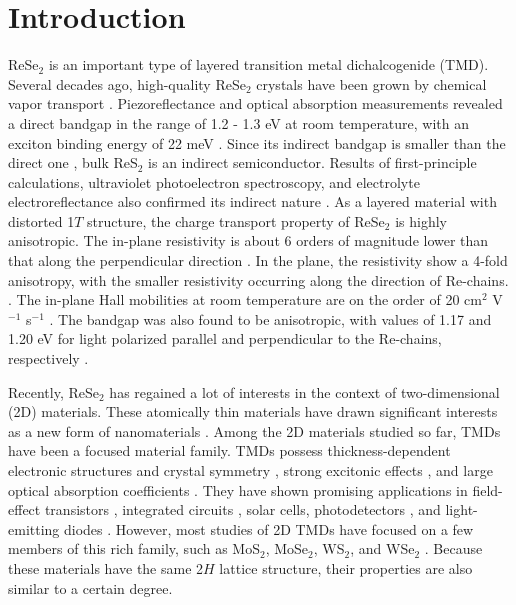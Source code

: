 \documentclass{osa-article}
\begin{document}
\section{Introduction}
ReSe$_2$ is an important type of layered transition metal dichalcogenide (TMD). Several decades ago, high-quality ReSe$_2$ crystals have been grown by chemical vapor transport \cite{ssc61531,b5515608}. Piezoreflectance \cite{b5515608} and optical absorption measurements \cite{jap816380} revealed a direct bandgap in the range of 1.2 - 1.3 eV at room temperature, with an exciton binding energy of 22 meV \cite{b5515608}. Since its indirect bandgap is smaller than the direct one \cite{b5816130}, bulk ReS$_2$ is an indirect semiconductor. Results of first-principle calculations, ultraviolet photoelectron spectroscopy, and electrolyte electroreflectance also confirmed its indirect nature \cite{b6015766,jpcm94411}. As a layered material with distorted 1$T$ structure, the charge transport property of ReSe$_2$ is highly anisotropic. The in-plane resistivity is about 6 orders of magnitude lower than that along the perpendicular direction \cite{ssc111635}. In the plane, the resistivity show a 4-fold anisotropy, with the smaller resistivity occurring along the direction of Re-chains. \cite{ssc111635}. The in-plane Hall mobilities at room temperature are on the order of 20 cm$^2$ V$^{-1}$ s$^{-1}$ \cite{ssc111635}. The bandgap was also found to be anisotropic, with values of 1.17 and 1.20 eV for light polarized parallel and perpendicular to the Re-chains, respectively \cite{b5816130}.

Recently, ReSe$_2$ has regained a lot of interests in the context of two-dimensional (2D) materials. 
These atomically thin materials have drawn significant interests as a new form of nanomaterials \cite{n522274,nn7699,2dm3042001}. Among the 2D materials studied so far, TMDs have been a focused material family. TMDs possess thickness-dependent electronic structures \cite{nl101271,l105136805} and crystal symmetry \cite{b87161403,nl133329}, strong excitonic effects \cite{l113076802,l113026803}, and large optical absorption coefficients \cite{s3401311,apl105201905}. They have shown promising applications in field-effect transistors \cite{nn6147,nm12815}, integrated circuits \cite{nl124674}, solar cells\cite{nn9262}, photodetectors \cite{nn9262}, and light-emitting diodes \cite{s344725,nn9268,nn9257}. However, most studies of 2D TMDs have focused on a few members of this rich family, such as MoS$_2$, MoSe$_2$, WS$_2$, and WSe$_2$ \cite{2dm3042001}. Because these materials have the same 2$H$ lattice structure, their properties are also similar to a certain degree. 
\end{document}

